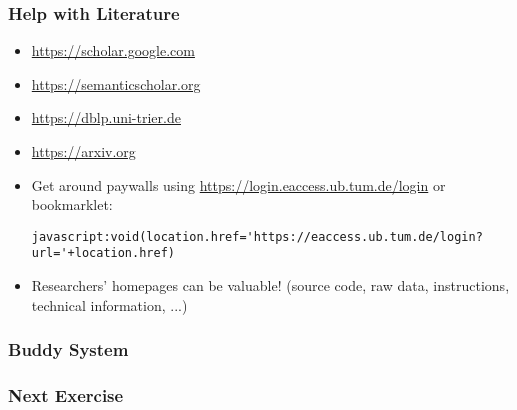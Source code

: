 \documentclass{i20lecture}
\begin{document}
\begin{frame}[fragile]
	\frametitle{Help with Literature}
  \begin{itemize}
      \item \url{https://scholar.google.com}
      \item \url{https://semanticscholar.org}
	  \item \url{https://dblp.uni-trier.de}
      \item \url{https://arxiv.org}
      \item Get around paywalls using
          \url{https://login.eaccess.ub.tum.de/login} or bookmarklet:
          \begin{lstlisting}
javascript:void(location.href='https://eaccess.ub.tum.de/login?url='+location.href)
          \end{lstlisting}
      \item Researchers' homepages can be \alert{valuable}! (source code, raw data, instructions, technical information, ...)
  \end{itemize}
\end{frame}

\begin{frame}
	\frametitle{Buddy System}

\end{frame}



\begin{frame}
	\frametitle{Next Exercise} 
\end{frame}
\end{document}

